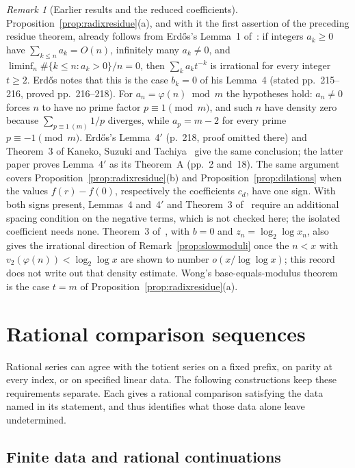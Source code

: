 \documentclass[11pt]{article}
\theoremstyle{plain}
\theoremstyle{definition}
\theoremstyle{remark}
\newtheorem{rem}[thm]{Remark}
\begin{document}
\begin{rem}[Earlier results and the reduced coefficients]
\label{rem:erdos1957}
Proposition~\ref{prop:radixresidue}(a), and with it the first assertion
of the preceding residue theorem, already follows from Erd\H{o}s's
Lemma~1 of~\cite[p.~213]{erdos1957}: if integers $a_k\ge0$ have
$\sum_{k\le n}a_k=O(n)$, infinitely many $a_k\ne0$, and
$\liminf_n\#\{k\le n:a_k>0\}/n=0$, then $\sum_ka_kt^{-k}$ is irrational for
every integer $t\ge2$. Erd\H{o}s notes that this is the case $b_k=0$ of his
Lemma~4 (stated pp.~215--216, proved pp.~216--218). For
$a_n=\varphi(n)\bmod m$ the hypotheses hold: $a_n\ne0$ forces $n$ to have
no prime factor $p\equiv1\pmod m$, and such $n$ have density zero because
$\sum_{p\equiv1\ (m)}1/p$ diverges, while $a_p=m-2$ for every prime
$p\equiv-1\pmod m$. Erd\H{o}s's Lemma~4$'$ (p.~218, proof omitted there)
and Theorem~3 of Kaneko, Suzuki and Tachiya~\cite[p.~5]{kst2026} give the
same conclusion; the latter paper proves Lemma~4$'$ as its Theorem~A
(pp.~2 and~18). The same argument covers
Proposition~\ref{prop:radixresidue}(b) and Proposition~\ref{prop:dilations}
when the values $f(r)-f(0)$, respectively the coefficients $c_d$, have one
sign. With both signs present, Lemmas~4 and~4$'$ and Theorem~3
of~\cite{kst2026} require an additional spacing condition on the negative
terms, which is not checked here; the isolated coefficient needs none.
Theorem~3 of~\cite{kst2026}, with $b=0$ and $z_n=\log_2\log x_n$, also
gives the irrational direction of Remark~\ref{prop:slowmoduli} once
the $n<x$ with $v_2(\varphi(n))<\log_2\log x$ are shown to number
$o(x/\log\log x)$; this record does not write out that density estimate.
Wong's base-equals-modulus theorem~\cite{wong2015} is the case $t=m$ of
Proposition~\ref{prop:radixresidue}(a).
\end{rem}

\section{Rational comparison sequences}
\label{sec:wall}

Rational series can agree with the totient series on a fixed prefix,
on parity at every index, or on specified linear data. The following
constructions keep these requirements separate. Each gives a rational
comparison satisfying the data named in its statement, and thus
identifies what those data alone leave undetermined.

\subsection{Finite data and rational continuations}
\end{document}

